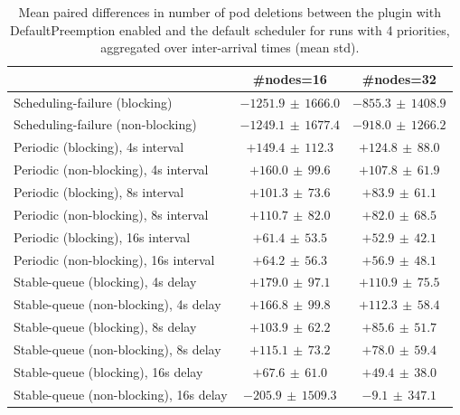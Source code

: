 \begin{table}[t]
\tiny
\setlength{\tabcolsep}{1.2pt}
\renewcommand{\arraystretch}{1.12}
\centering
\caption{Mean paired differences in number of pod deletions between the plugin with DefaultPreemption enabled and the default scheduler for runs with 4 priorities, aggregated over inter-arrival times (mean \pm std).}
\label{tab:deletions-defpreempt1-prio4-std1-agg-arrival}
\begin{tabular}{l c c}
\toprule
 & \#nodes=16 & \#nodes=32 \\
\midrule
Scheduling-failure (blocking) & $-1251.9\,\pm\,1666.0$ & $-855.3\,\pm\,1408.9$ \\
Scheduling-failure (non-blocking) & $-1249.1\,\pm\,1677.4$ & $-918.0\,\pm\,1266.2$ \\
Periodic (blocking), 4s interval & $+149.4\,\pm\,112.3$ & $+124.8\,\pm\,88.0$ \\
Periodic (non-blocking), 4s interval & $+160.0\,\pm\,99.6$ & $+107.8\,\pm\,61.9$ \\
Periodic (blocking), 8s interval & $+101.3\,\pm\,73.6$ & $+83.9\,\pm\,61.1$ \\
Periodic (non-blocking), 8s interval & $+110.7\,\pm\,82.0$ & $+82.0\,\pm\,68.5$ \\
Periodic (blocking), 16s interval & $+61.4\,\pm\,53.5$ & $+52.9\,\pm\,42.1$ \\
Periodic (non-blocking), 16s interval & $+64.2\,\pm\,56.3$ & $+56.9\,\pm\,48.1$ \\
Stable-queue (blocking), 4s delay & $+179.0\,\pm\,97.1$ & $+110.9\,\pm\,75.5$ \\
Stable-queue (non-blocking), 4s delay & $+166.8\,\pm\,99.8$ & $+112.3\,\pm\,58.4$ \\
Stable-queue (blocking), 8s delay & $+103.9\,\pm\,62.2$ & $+85.6\,\pm\,51.7$ \\
Stable-queue (non-blocking), 8s delay & $+115.1\,\pm\,73.2$ & $+78.0\,\pm\,59.4$ \\
Stable-queue (blocking), 16s delay & $+67.6\,\pm\,61.0$ & $+49.4\,\pm\,38.0$ \\
Stable-queue (non-blocking), 16s delay & $-205.9\,\pm\,1509.3$ & $-9.1\,\pm\,347.1$ \\
\bottomrule
\end{tabular}
\end{table}
